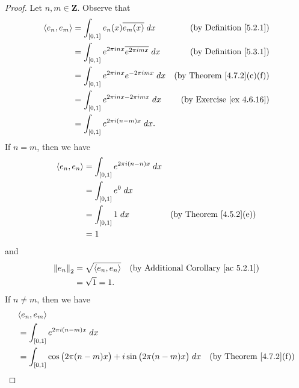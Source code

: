 \begin{proof}
    Let \(n, m \in \mathbf{Z}\).
    Observe that
    \begin{align*}
        \inner*{e_n, e_m} & = \int_{[0, 1]} e_n(x) \overline{e_m(x)} \; dx                   & \text{(by Definition \ref{5.2.1})}    \\
                          & = \int_{[0, 1]} e^{2 \pi i n x} \overline{e^{2 \pi i m x}} \; dx & \text{(by Definition \ref{5.3.1})}    \\
                          & = \int_{[0, 1]} e^{2 \pi i n x} e^{- 2 \pi i m x} \; dx          & \text{(by Theorem \ref{4.7.2}(c)(f))} \\
                          & = \int_{[0, 1]} e^{2 \pi i n x - 2 \pi i m x} \; dx              & \text{(by Exercise \ref{ex 4.6.16})}  \\
                          & = \int_{[0, 1]} e^{2 \pi i (n - m) x} \; dx.
    \end{align*}
    If \(n = m\), then we have
    \begin{align*}
        \inner*{e_n, e_n} & = \int_{[0, 1]} e^{2 \pi i (n - n) x} \; dx                                      \\
                          & = \int_{[0, 1]} e^0 \; dx                                                        \\
                          & = \int_{[0, 1]} 1 \; dx                     & \text{(by Theorem \ref{4.5.2}(e))} \\
                          & = 1
    \end{align*}
    and
    \begin{align*}
        \norm*{e_n}_2 & = \sqrt{\inner*{e_n, e_n}} & \text{(by Additional Corollary \ref{ac 5.2.1})} \\
                      & = \sqrt{1} = 1.
    \end{align*}
    If \(n \neq m\), then we have
    \begin{align*}
         & \inner*{e_n, e_m}                                                                                                                                \\
         & = \int_{[0, 1]} e^{2 \pi i (n - m) x} \; dx                                                                                                      \\
         & = \int_{[0, 1]} \cos\big(2 \pi (n - m) x\big) + i \sin\big(2 \pi (n - m) x\big) \; dx       & \text{(by Theorem \ref{4.7.2}(f))}                 \\

\end{align*}
\end{proof}

